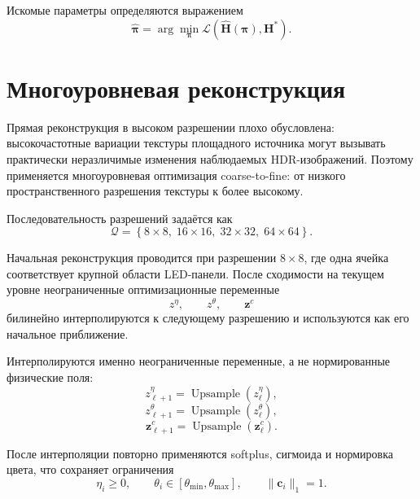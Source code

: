 Искомые параметры определяются выражением
\begin{equation}
\hat{\boldsymbol{\pi}}
=
\arg\min_{\boldsymbol{\pi}}
\mathcal{L}
\left(
\hat{\mathbf{H}}(\boldsymbol{\pi}),
\mathbf{H}^\ast
\right).
\end{equation}

\section{Многоуровневая реконструкция}

Прямая реконструкция в высоком разрешении плохо обусловлена: высокочастотные вариации текстуры площадного источника могут вызывать практически неразличимые изменения наблюдаемых HDR-изображений. Поэтому применяется многоуровневая оптимизация coarse-to-fine: от низкого пространственного разрешения текстуры к более высокому.

Последовательность разрешений задаётся как
\begin{equation}
\mathcal{Q}=
\left\{
8\times 8,\;
16\times 16,\;
32\times 32,\;
64\times 64
\right\}.
\end{equation}

Начальная реконструкция проводится при разрешении $8\times8$, где одна ячейка соответствует крупной области LED-панели. После сходимости на текущем уровне неограниченные оптимизационные переменные
\begin{equation}
z^\eta,\qquad z^\theta,\qquad \mathbf{z}^c
\end{equation}
билинейно интерполируются к следующему разрешению и используются как его начальное приближение.

Интерполируются именно неограниченные переменные, а не нормированные физические поля:
\begin{equation}
z^\eta_{\ell+1}
=
\operatorname{Upsample}(z^\eta_\ell),
\end{equation}
\begin{equation}
z^\theta_{\ell+1}
=
\operatorname{Upsample}(z^\theta_\ell),
\end{equation}
\begin{equation}
\mathbf{z}^{c}_{\ell+1}
=
\operatorname{Upsample}(\mathbf{z}^{c}_\ell).
\end{equation}

После интерполяции повторно применяются softplus, сигмоида и нормировка цвета, что сохраняет ограничения
\begin{equation}
\eta_i\geq 0,
\qquad
\theta_i\in[\theta_{\min},\theta_{\max}],
\qquad
\|\mathbf{c}_i\|_1=1.
\end{equation}

